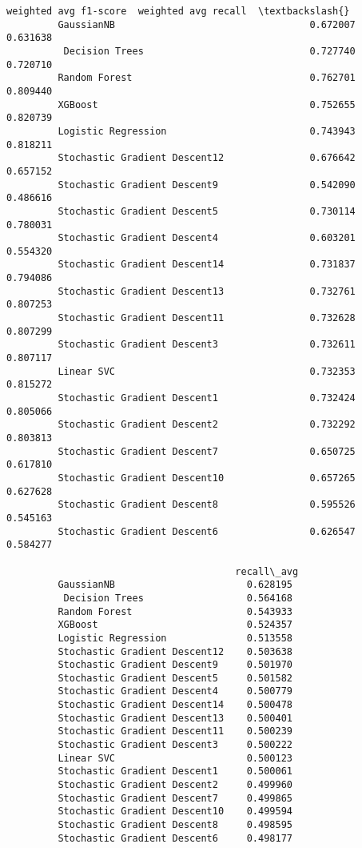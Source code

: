 \documentclass[11pt]{article}
\begin{document}
\begin{Verbatim}[commandchars=\\\{\}]
                                        weighted avg f1-score  weighted avg recall  \textbackslash{}
         GaussianNB                                  0.672007             0.631638   
          Decision Trees                             0.727740             0.720710   
         Random Forest                               0.762701             0.809440   
         XGBoost                                     0.752655             0.820739   
         Logistic Regression                         0.743943             0.818211   
         Stochastic Gradient Descent12               0.676642             0.657152   
         Stochastic Gradient Descent9                0.542090             0.486616   
         Stochastic Gradient Descent5                0.730114             0.780031   
         Stochastic Gradient Descent4                0.603201             0.554320   
         Stochastic Gradient Descent14               0.731837             0.794086   
         Stochastic Gradient Descent13               0.732761             0.807253   
         Stochastic Gradient Descent11               0.732628             0.807299   
         Stochastic Gradient Descent3                0.732611             0.807117   
         Linear SVC                                  0.732353             0.815272   
         Stochastic Gradient Descent1                0.732424             0.805066   
         Stochastic Gradient Descent2                0.732292             0.803813   
         Stochastic Gradient Descent7                0.650725             0.617810   
         Stochastic Gradient Descent10               0.657265             0.627628   
         Stochastic Gradient Descent8                0.595526             0.545163   
         Stochastic Gradient Descent6                0.626547             0.584277   
         
                                        recall\_avg  
         GaussianNB                       0.628195  
          Decision Trees                  0.564168  
         Random Forest                    0.543933  
         XGBoost                          0.524357  
         Logistic Regression              0.513558  
         Stochastic Gradient Descent12    0.503638  
         Stochastic Gradient Descent9     0.501970  
         Stochastic Gradient Descent5     0.501582  
         Stochastic Gradient Descent4     0.500779  
         Stochastic Gradient Descent14    0.500478  
         Stochastic Gradient Descent13    0.500401  
         Stochastic Gradient Descent11    0.500239  
         Stochastic Gradient Descent3     0.500222  
         Linear SVC                       0.500123  
         Stochastic Gradient Descent1     0.500061  
         Stochastic Gradient Descent2     0.499960  
         Stochastic Gradient Descent7     0.499865  
         Stochastic Gradient Descent10    0.499594  
         Stochastic Gradient Descent8     0.498595  
         Stochastic Gradient Descent6     0.498177  
\end{Verbatim}
            
\end{document}
